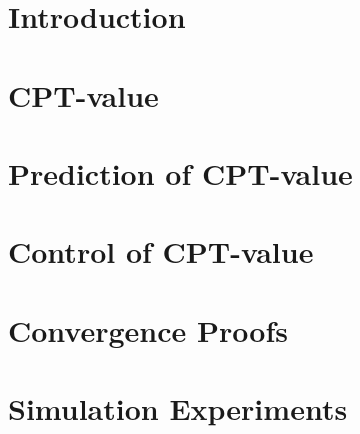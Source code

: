\documentclass[twocolumn]{IEEEtran}
\begin{document}
\section{Introduction}
\label{sec:introduction}



\section{CPT-value}
\label{sec:cpt-val}




\section{Prediction of CPT-value} 
\label{sec:cpt-sampling}



\section{Control of CPT-value}
\label{sec:cpt-control}



\section{Convergence Proofs}
\label{sec:convergence}

\section{Simulation Experiments}
\label{sec:expts}
\end{document}
